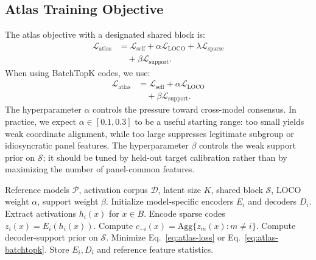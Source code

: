 \documentclass[11pt]{article}
\newcommand{\panel}{\mathcal{P}}
\newcommand{\agg}{\mathrm{Agg}}
\newcommand{\shared}{\mathcal{S}}
\begin{document}
\subsection{Atlas Training Objective}

The atlas objective with a designated shared block is:
\begin{equation}
\boxed{
    \begin{aligned}
    \mathcal{L}_{\mathrm{atlas}}
    &= \mathcal{L}_{\mathrm{self}}
    + \alpha \mathcal{L}_{\mathrm{LOCO}}
    + \lambda \mathcal{L}_{\mathrm{sparse}}\\
    &\quad
    + \beta \mathcal{L}_{\mathrm{support}}.
    \end{aligned}
}
\label{eq:atlas-loss}
\end{equation}
When using BatchTopK codes, we use:
\begin{equation}
\boxed{
    \begin{aligned}
    \mathcal{L}_{\mathrm{atlas}}
    &= \mathcal{L}_{\mathrm{self}}
    + \alpha \mathcal{L}_{\mathrm{LOCO}}
    \\
    &\quad
    + \beta \mathcal{L}_{\mathrm{support}}.
    \end{aligned}
}
\label{eq:atlas-batchtopk}
\end{equation}
The hyperparameter $\alpha$ controls the pressure toward cross-model consensus. In practice, we expect $\alpha \in [0.1,0.3]$ to be a useful starting range: too small yields weak coordinate alignment, while too large suppresses legitimate subgroup or idiosyncratic panel features. The hyperparameter $\beta$ controls the weak support prior on $\shared$; it should be tuned by held-out target calibration rather than by maximizing the number of panel-common features.

\begin{algorithm}[t]
\caption{Reference Feature Atlas Training}
\label{alg:atlas}
\begin{algorithmic}[1]
\REQUIRE Reference models $\panel$, activation corpus $\mathcal{D}$, latent size $K$, shared block $\shared$, LOCO weight $\alpha$, support weight $\beta$.
\STATE Initialize model-specific encoders $E_i$ and decoders $D_i$.
        \STATE Extract activations $h_i(x)$ for $x\in B$.
        \STATE Encode sparse codes $z_i(x)=E_i(h_i(x))$.
    \ENDFOR
        \STATE Compute $c_{-i}(x)=\agg\{z_m(x):m\neq i\}$.
    \ENDFOR
    \STATE Compute decoder-support prior on $\shared$.
    \STATE Minimize Eq.~\ref{eq:atlas-loss} or Eq.~\ref{eq:atlas-batchtopk}.
\ENDFOR
\STATE Store $E_i,D_i$ and reference feature statistics.
\end{algorithmic}
\end{algorithm}
\end{document}
